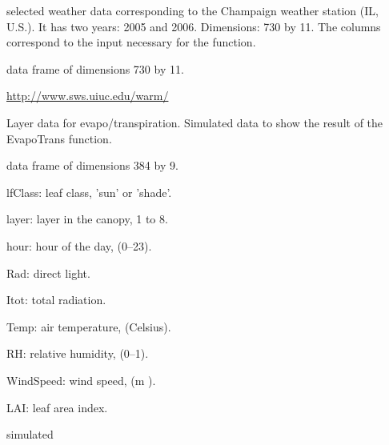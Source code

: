 \documentclass[letterpaper]{book}
\begin{document}
%
\begin{Description}\relax
selected weather data corresponding to the Champaign
weather station (IL, U.S.). It has two years: 2005 and
2006. Dimensions: 730 by 11. The columns correspond to
the input necessary for the  function.
\end{Description}
%
\begin{Format}
data frame of dimensions 730 by 11.
\end{Format}
%
\begin{Source}\relax
\url{http://www.sws.uiuc.edu/warm/}
\end{Source}
%
\begin{Description}\relax
Layer data for evapo/transpiration. Simulated data to
show the result of the EvapoTrans function.
\end{Description}
%
\begin{Format}
data frame of dimensions 384 by 9.
\end{Format}
%
\begin{Details}\relax
lfClass: leaf class, 'sun' or 'shade'.

layer: layer in the canopy, 1 to 8.

hour: hour of the day, (0--23).

Rad: direct light.

Itot: total radiation.

Temp: air temperature, (Celsius).

RH: relative humidity, (0--1).

WindSpeed: wind speed, (m ).

LAI: leaf area index.
\end{Details}
%
\begin{Source}\relax
simulated
\end{Source}
\end{document}
